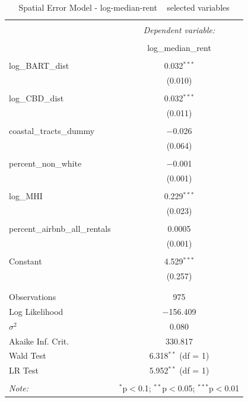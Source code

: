 \documentclass[10pt, letterpaper]{amsart}
\begin{document}
\begin{table}[!htbp] \centering 
  \caption{Spatial Error Model - log-median-rent ~ selected variables} 
  \label{} 
  \begin{tabular}{@{\extracolsep{5pt}}lc} 
    \\[-1.8ex]\hline 
    \hline \\[-1.8ex] 
    & \multicolumn{1}{c}{\textit{Dependent variable:}} \\ 
    \cline{2-2} 
    \\[-1.8ex] & log\_median\_rent \\ 
    \hline \\[-1.8ex] 
    log\_BART\_dist & 0.032$^{***}$ \\ 
    & (0.010) \\ 
    & \\ 
    log\_CBD\_dist & 0.032$^{***}$ \\ 
    & (0.011) \\ 
    & \\ 
    coastal\_tracts\_dummy & $-$0.026 \\ 
    & (0.064) \\ 
    & \\ 
    percent\_non\_white & $-$0.001 \\ 
    & (0.001) \\ 
    & \\ 
    log\_MHI & 0.229$^{***}$ \\ 
    & (0.023) \\ 
    & \\ 
    percent\_airbnb\_all\_rentals & 0.0005 \\ 
    & (0.001) \\ 
    & \\ 
    Constant & 4.529$^{***}$ \\ 
    & (0.257) \\ 
    & \\ 
    \hline \\[-1.8ex] 
    Observations & 975 \\ 
    Log Likelihood & $-$156.409 \\ 
    $\sigma^{2}$ & 0.080 \\ 
    Akaike Inf. Crit. & 330.817 \\ 
    Wald Test & 6.318$^{**}$ (df = 1) \\ 
    LR Test & 5.952$^{**}$ (df = 1) \\ 
    \hline 
    \hline \\[-1.8ex] 
    \textit{Note:}  & \multicolumn{1}{r}{$^{*}$p$<$0.1; $^{**}$p$<$0.05; $^{***}$p$<$0.01} \\ 
  \end{tabular} 
\end{table} 
\end{document}
